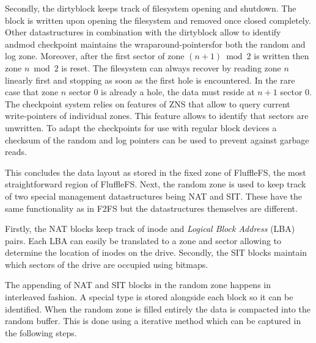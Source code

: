 Secondly, the dirtyblock keeps track of filesystem opening and shutdown. The 
block is written upon opening the filesystem and removed once closed completely.
Other datastructures in combination with the dirtyblock allow to identify andmod
checkpoint maintains the wraparound-pointers\footnotemark[13] for both the random
and log zone. Moreover, after the first sector of zone $(n+1) \bmod{2}$ is
written then zone $n \bmod{2}$ is reset. The filesystem can always recover by
reading zone $n$ linearly first and stopping as soon as the first hole is
encountered. In the rare case that zone $n$ sector $0$ is already a hole, the
data must reside at $n+1$ sector $0$. The checkpoint system relies on features
of ZNS that allow to query current write-pointers of individual zones. This
feature allows to identify that sectors are unwritten. To adapt the checkpoints
for use with regular block devices a checksum of the random and log pointers can
be used to prevent against garbage reads.


This concludes the data layout as stored in the fixed zone of FluffleFS, the
most straightforward region of FluffleFS. Next, the random zone is used to keep
track of two special management datastructures being NAT and SIT. These have the
same functionality as in F2FS but the datastructures themselves are different.

Firstly, the NAT blocks keep track of inode and \textit{Logical Block Address}
(LBA) pairs. Each LBA can easily be translated to a zone and sector allowing to
determine the location of inodes on the drive. Secondly, the SIT blocks
maintain which sectors of the drive are occupied using bitmaps.

The appending of NAT and SIT blocks in the random zone happens in interleaved
fashion. A special type is stored alongside each block so it can be identified.
When the random zone is filled entirely the data is compacted into the random
buffer. This is done using a iterative method which can be captured in the
following steps.

